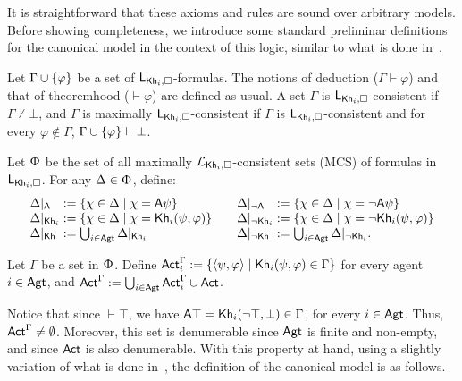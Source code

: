 It is straightforward that these axioms and rules are sound over arbitrary models.
Before showing completeness, we introduce some standard preliminar definitions for the canonical model in the context of this logic, similar to what is done in~\cite{AFSVQ21,AFSVQ23report}.

\medskip

\begin{definition}\label{def:notation-completeness}
Let $\Gamma\cup\{ \varphi \}$ be a set of $\mathsf{L}_{{\sf Kh}_i,\square}$-formulas. The notions of deduction ($\Gamma \vdash \varphi$) and that of theoremhood ($\vdash \varphi$) 
are defined as usual. 
A set $\Gamma$ is $\mathsf{L}_{{\sf Kh}_i,\square}$-consistent if $\Gamma \not \vdash \bot$, and 
$\Gamma$ is maximally $\mathsf{L}_{{\sf Kh}_i,\square}$-consistent if $\Gamma$ is $\mathsf{L}_{{\sf Kh}_i,\square}$-consistent and for every $\varphi \not\in \Gamma $, $\Gamma \cup \{ \varphi \} \vdash \bot$.
\end{definition}

\medskip

\begin{definition}
Let $\Upphi$ be the set of all maximally $\mathcal{L}_{{\sf Kh}_i,\square}$-consistent sets (MCS) of formulas in $\mathsf{L}_{{\sf Kh}_i,\square}$.
For any $\Delta \in \Upphi$, define:
\[
\begin{array}{l@{\;:=\;}l@{\quad\quad}l@{\;:=\;}l}
\resta{\Delta}  & \setof{\chi \in \Delta}{\chi = \A\psi} &
\restna{\Delta} & \setof{\chi \in \Delta}{\chi = \lnot \A\psi} \\
\restkhi{\Delta}  & \setof{\chi \in \Delta}{\chi = \khi(\psi,\varphi)} &
\restnkhi{\Delta} & \setof{\chi \in \Delta}{\chi = \lnot \khi(\psi,\varphi)} \\
\restkh{\Delta}   & \bigcup_{i \in \AGT} \restkhi{\Delta} &
\restnkh{\Delta}  & \bigcup_{i \in \AGT} \restnkhi{\Delta}. \\
\end{array}
\]

Let $\Gamma$ be a set in $\Upphi$.
Define ${\rm \sf Act}^\Gamma_i := \{ \langle \psi,\varphi \rangle \mid {\sf Kh}_i(\psi,\varphi) \in \Gamma \}$ for every agent $i \in {\rm \sf Agt}$, and ${\rm \sf Act}^\Gamma := \bigcup_{i \in {\rm \sf Agt}} {\rm \sf Act}^\Gamma_i\cup {\rm \sf Act}$.
\end{definition}

Notice that since $\vdash \top$, we have ${\sf A}\top = {\sf Kh}_i(\neg\top,\bot) \in \Gamma$, for every $i \in {\rm \sf Agt}$. Thus, ${\rm \sf Act}^\Gamma \neq \emptyset$. Moreover, this set is denumerable since ${\rm \sf Agt}$ is finite and non-empty, and since ${\rm \sf Act}$ is also denumerable. 
With this property at hand, using a slightly variation of what is done in~\cite{AFSVQ21,AFSVQ23report}, the definition of the canonical model is as follows.

